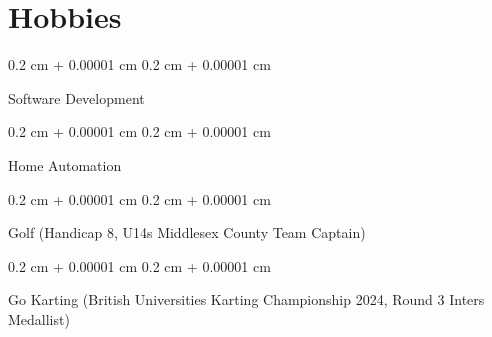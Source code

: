 \documentclass[10pt, letterpaper]{article}
\newenvironment{onecolentry}{
    \begin{adjustwidth}{
        0.2 cm + 0.00001 cm
    }{
        0.2 cm + 0.00001 cm
    }
}{
    \end{adjustwidth}
} %
\begin{document}
    
    \section{Hobbies}



        
        \begin{onecolentry}
            Software Development
        \end{onecolentry}

        \vspace{0.2 cm}

        \begin{onecolentry}
            Home Automation
        \end{onecolentry}

        \vspace{0.2 cm}

        \begin{onecolentry}
            Golf (Handicap 8, U14s Middlesex County Team Captain)
        \end{onecolentry}

        \vspace{0.2 cm}

        \begin{onecolentry}
            Go Karting (British Universities Karting Championship 2024, Round 3 Inters Medallist)
        \end{onecolentry}


    
\end{document}
